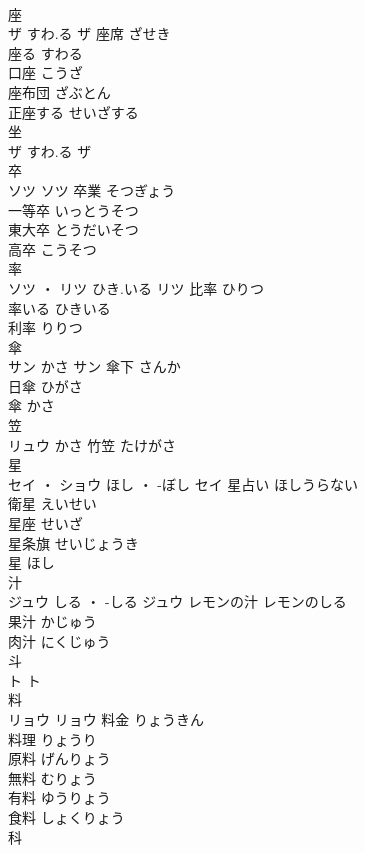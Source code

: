 \documentclass[8pt]{extreport}
\begin{document}
\begin{CJK}{UTF8}{min}
\\	座	
\\	ザ	すわ.る	ザ	座席	ざせき	
\\	座る	すわる	
\\	口座	こうざ	
\\	座布団	ざぶとん	
\\	正座する	せいざする	
\\	坐	
\\	ザ	すわ.る	ザ																																			
\\	卒	
\\	ソツ		ソツ	卒業	そつぎょう	
\\	一等卒	いっとうそつ	
\\	東大卒	とうだいそつ	
\\	高卒	こうそつ	
\\	率	
\\	ソツ ・ リツ	ひき.いる	リツ	比率	ひりつ	
\\	率いる	ひきいる	
\\	利率	りりつ	
\\	傘	
\\	サン	かさ	サン	傘下	さんか	
\\	日傘	ひがさ	
\\	傘	かさ	
\\	笠	
\\	リュウ	かさ														竹笠	たけがさ	
\\	星	
\\	セイ ・ ショウ	ほし ・ -ぼし	セイ	星占い	ほしうらない	
\\	衛星	えいせい	
\\	星座	せいざ	
\\	星条旗	せいじょうき	
\\	星	ほし	
\\	汁	
\\	ジュウ	しる ・ -しる	ジュウ	レモンの汁	レモンのしる	
\\	果汁	かじゅう	
\\	肉汁	にくじゅう	
\\	斗	
\\	ト		ト																																			
\\	料	
\\	リョウ		リョウ	料金	りょうきん	
\\	料理	りょうり	
\\	原料	げんりょう	
\\	無料	むりょう	
\\	有料	ゆうりょう	
\\	食料	しょくりょう	
\\	科	

\end{CJK}
\end{document}
